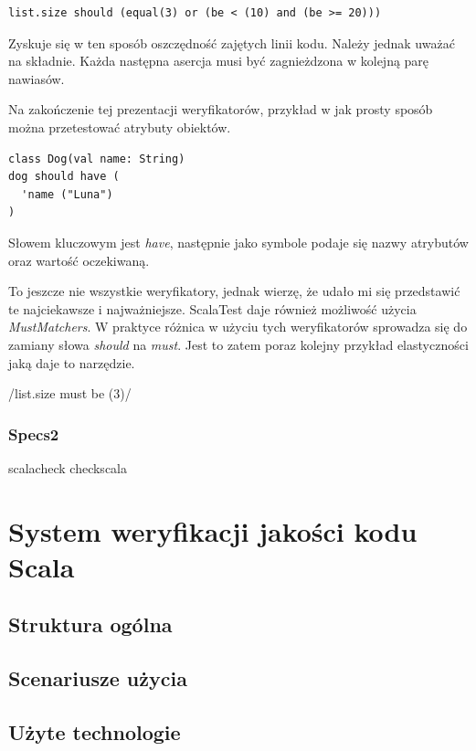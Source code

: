 \documentclass[brudnopis]{xmgr}
\begin{document}
\begin{verbatim}
list.size should (equal(3) or (be < (10) and (be >= 20)))
\end{verbatim}

Zyskuje się w ten sposób oszczędność zajętych linii kodu. Należy jednak uważać na składnie. Każda następna asercja musi być zagnieżdzona w kolejną parę nawiasów.

Na zakończenie tej prezentacji weryfikatorów, przykład w jak prosty sposób można przetestować atrybuty obiektów.

\begin{verbatim}
class Dog(val name: String)
dog should have (
  'name ("Luna")
)
\end{verbatim}

Słowem kluczowym jest \emph{have}, następnie jako symbole podaje się nazwy atrybutów oraz wartość oczekiwaną.

To jeszcze nie wszystkie weryfikatory, jednak wierzę, że udało mi się przedstawić te najciekawsze i najważniejsze. ScalaTest daje również możliwość użycia \emph{MustMatchers}. W praktyce różnica w użyciu tych weryfikatorów sprowadza się do zamiany słowa \emph{should} na \emph{must}. Jest to zatem poraz kolejny przykład elastyczności jaką daje to narzędzie.

/list.size must be (3)/ 

\subsection{Specs2}

scalacheck checkscala

\chapter{System weryfikacji jakości kodu Scala}

\section{Struktura ogólna}

\section{Scenariusze użycia}

\section{Użyte technologie}
\end{document}
